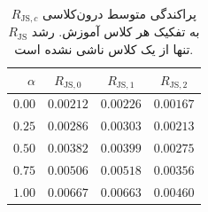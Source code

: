 \begin{table}[htbp]
\centering\small
\caption{پراکندگی متوسط درون‌کلاسی $R_{\mathrm{JS},c}$ به تفکیک هر کلاس آموزش. رشد $R_{\mathrm{JS}}$ تنها از یک کلاس ناشی نشده است.}
\label{tab:ch4-guided-mixture-classwise-dispersion}
\begin{tabular}{rccc}\hline
$\alpha$ & $R_{\mathrm{JS},0}$ & $R_{\mathrm{JS},1}$ & $R_{\mathrm{JS},2}$\\\hline
$0.00$ & $0.00212$ & $0.00226$ & $0.00167$ \\
$0.25$ & $0.00286$ & $0.00303$ & $0.00213$ \\
$0.50$ & $0.00382$ & $0.00399$ & $0.00275$ \\
$0.75$ & $0.00506$ & $0.00518$ & $0.00356$ \\
$1.00$ & $0.00667$ & $0.00663$ & $0.00460$ \\
\hline
\end{tabular}
\end{table}

